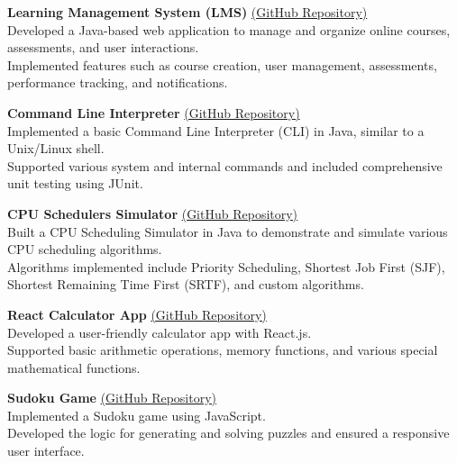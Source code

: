 \textbf{Learning Management System (LMS)} \href{https://github.com/YassenAli/Learning-Management-System-LMS}{(GitHub Repository)}  \\
\textbullet{}\hspace{2mm} Developed a Java-based web application to manage and organize online courses, assessments, and user interactions.  \\
\textbullet{}\hspace{2mm} Implemented features such as course creation, user management, assessments, performance tracking, and notifications.

\textbf{Command Line Interpreter} \href{https://github.com/YassenAli/Command-Line-Interpreter}{(GitHub Repository)}  \\
\textbullet{}\hspace{2mm} Implemented a basic Command Line Interpreter (CLI) in Java, similar to a Unix/Linux shell.  \\
\textbullet{}\hspace{2mm} Supported various system and internal commands and included comprehensive unit testing using JUnit.

\textbf{CPU Schedulers Simulator} \href{https://github.com/YassenAli/CPU-Schedulers-Simulator}{(GitHub Repository)}  \\
\textbullet{}\hspace{2mm} Built a CPU Scheduling Simulator in Java to demonstrate and simulate various CPU scheduling algorithms.  \\
\textbullet{}\hspace{2mm} Algorithms implemented include Priority Scheduling, Shortest Job First (SJF), Shortest Remaining Time First (SRTF), and custom algorithms.

\textbf{React Calculator App} \href{https://github.com/YassenAli/Calculator}{(GitHub Repository)}  \\
\textbullet{}\hspace{2mm} Developed a user-friendly calculator app with React.js.  \\
\textbullet{}\hspace{2mm} Supported basic arithmetic operations, memory functions, and various special mathematical functions.

\textbf{Sudoku Game} \href{https://github.com/YassenAli/Sudoku-Game}{(GitHub Repository)}  \\
\textbullet{}\hspace{2mm} Implemented a Sudoku game using JavaScript.  \\
\textbullet{}\hspace{2mm} Developed the logic for generating and solving puzzles and ensured a responsive user interface.

